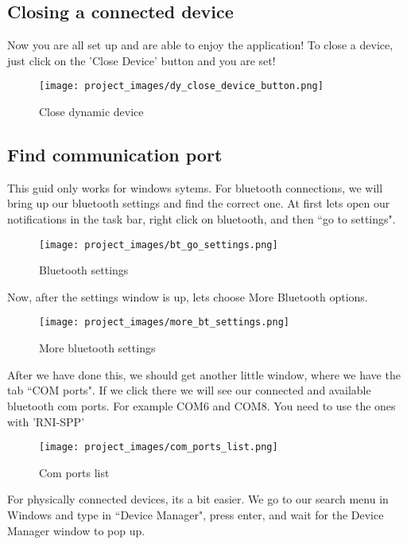 	\subsection{Closing a connected device}
	Now you are all set up and are able to enjoy the application! To close a device, just click on the 'Close Device' button and you are set!

	\begin{figure}[H]
	\centering
	\texttt{[image: project\_images/dy\_close\_device\_button.png]}
	 \caption{Close dynamic device}
	 \label{fig:close dynamic device}
	\end{figure}

	\subsection{Find communication port}
	 This guid only works for windows sytems.
	 For bluetooth connections, we will bring up our bluetooth settings and find the correct one.
	 At first lets open our notifications in the task bar, right click on bluetooth, and then ``go to settings".

	\begin{figure}[H]
	\centering
	\texttt{[image: project\_images/bt\_go\_settings.png]}
	 \caption{Bluetooth settings}
	 \label{fig:bt_settings}
	\end{figure}	

	Now, after the settings window is up, lets choose More Bluetooth options.

	\begin{figure}[H]
	\centering
	\texttt{[image: project\_images/more\_bt\_settings.png]}
	 \caption{More bluetooth settings}
	 \label{fig:more_bt_settings}
	\end{figure}

	After we have done this, we should get another little window, where we have the tab ``COM ports". If we click there we will see our connected and available bluetooth com ports. For example COM6 and COM8. You need to use the ones with 'RNI-SPP'

	\begin{figure}[H]
	\centering
	\texttt{[image: project\_images/com\_ports\_list.png]}
	 \caption{Com ports list}
	 \label{fig:com_ports_list}
	\end{figure}

For physically connected devices, its a bit easier. We go to our search menu in Windows and type in ``Device Manager", press enter, and wait for the Device Manager window to pop up.

